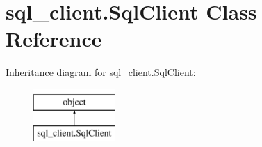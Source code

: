 \hypertarget{classsql__client_1_1_sql_client}{}\section{sql\+\_\+client.\+Sql\+Client Class Reference}
\label{classsql__client_1_1_sql_client}
Inheritance diagram for sql\+\_\+client.\+Sql\+Client\+:\begin{figure}[H]
\begin{center}
\leavevmode
\includegraphics[height=2.000000cm]{classsql__client_1_1_sql_client}
\end{center}
\end{figure}
